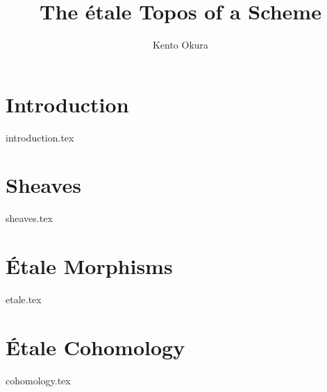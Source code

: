 \documentclass[11pt, openany]{memoir}
\title{The \'etale Topos of a Scheme}
\author{Kento Okura}
\begin{document}
  \chapter{Introduction}
  {introduction.tex}

  \chapter{Sheaves}
  {sheaves.tex}

  \chapter{\'Etale Morphisms}
  {etale.tex}

  \chapter{\'Etale Cohomology}
  {cohomology.tex}

  
  
\end{document}
